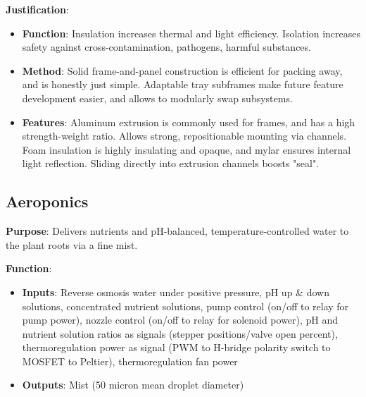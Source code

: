 \documentclass{report}
\begin{document}
\textbf{Justification}: 
\begin{itemize}
    \item \textbf{Function}: Insulation increases thermal and light efficiency. Isolation increases safety against cross-contamination, pathogens, harmful substances.
    \item \textbf{Method}: Solid frame-and-panel construction is efficient for packing away, and is honestly just simple. Adaptable tray subframes make future feature development easier, and allows to modularly swap subsystems.
    \item \textbf{Features}: Aluminum extrusion is commonly used for frames, and has a high strength-weight ratio. Allows strong, repositionable mounting via channels. Foam insulation is highly insulating and opaque, and mylar ensures internal light reflection. Sliding directly into extrusion channels boosts "seal".
\end{itemize}

\newpage

\subsection{Aeroponics}
\label{sec:aeroponics}

\textbf{Purpose}: Delivers nutrients and pH-balanced, temperature-controlled water to the plant roots via a fine mist.

\textbf{Function}:
\begin{itemize}
    \item \textbf{Inputs}: Reverse osmosis water under positive pressure, pH up \& down solutions, concentrated nutrient solutions, pump control (on/off to relay for pump power), nozzle control (on/off to relay for solenoid power), pH and nutrient solution ratios as signals (stepper positions/valve open percent), thermoregulation power as signal (PWM to H-bridge polarity switch to MOSFET to Peltier), thermoregulation fan power
    \item \textbf{Outputs}: Mist (50 micron mean droplet diameter)
\end{itemize}
\end{document}
